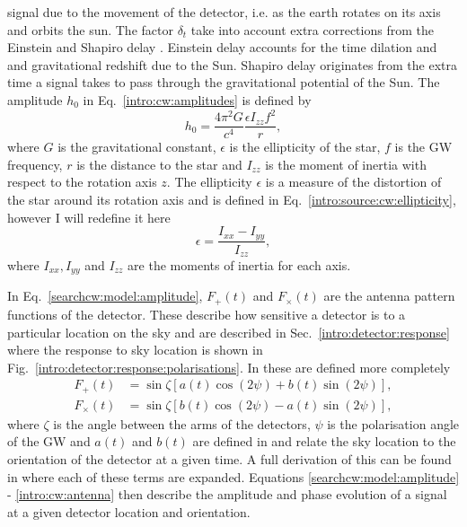 signal due to the movement of the detector, i.e. as the earth rotates on its axis and
orbits the sun. The factor $\delta_t$ take into account extra
corrections from the Einstein and Shapiro delay
\citep{taylor1992PulsarTiming}. Einstein delay accounts for the time dilation and and gravitational redshift due to the Sun. Shapiro delay originates from the extra time a signal takes to pass through the gravitational potential of the Sun. The amplitude
$h_0$ in Eq.~\ref{intro:cw:amplitudes} is defined by
%
\begin{equation}
    h_0 = \frac{4 \pi^2 G}{c^4} \frac{\epsilon I_{zz} f^2}{r},
\end{equation}
%
where $G$ is the gravitational constant, $\epsilon$ is the ellipticity of the star, $f$
is the \gls{GW} frequency, $r$ is the distance to the star and $I_{zz}$ is the
moment of inertia with respect to the rotation axis $z$.  The ellipticity $\epsilon$ is a measure of the distortion of the star around its rotation axis and is defined in Eq.~\ref{intro:source:cw:ellipticity}, however I will redefine it here
%
\begin{equation}
    \epsilon = \frac{I_{xx} - I_{yy}}{I_{zz}},
\end{equation}
%
where $I_{xx}, I_{yy}$ and $I_{zz}$ are the moments of inertia for each axis.

In Eq.~\ref{searchcw:model:amplitude}, $F_+(t)$ and $F_{\times}(t)$ are the antenna pattern
functions of the detector.  These describe how sensitive a detector is to a
particular location on the sky and are described in Sec.~\ref{intro:detector:response} where the response to
sky location is shown in Fig.~\ref{intro:detector:response:polarisations}.  In \citep{schutz1998DataAnalysis} these are defined more completely
%
\begin{equation}
\label{intro:cw:antenna}
\begin{split}
F_{+}(t) &= \sin{\zeta}[a(t)\cos{(2\psi)} + b(t)\sin{(2\psi)}], \\
F_{\times}(t) &= \sin{\zeta}[b(t) \cos{(2\psi)} - a(t)\sin{(2\psi)}],
\end{split}
\end{equation}
%
where $\zeta$ is the angle between the arms of the detectors, $\psi$ is the
polarisation angle of the \gls{GW} and $a(t)$ and $b(t)$ are defined in
\citep{schutz1998DataAnalysis} and relate the sky location to the orientation
of the detector at a given time.  A full derivation of this can be found in
\citep{schutz1998DataAnalysis} where each of these terms are expanded.
Equations \ref{searchcw:model:amplitude} - \ref{intro:cw:antenna} then describe the amplitude and phase evolution of a
signal at a given detector location and orientation.



